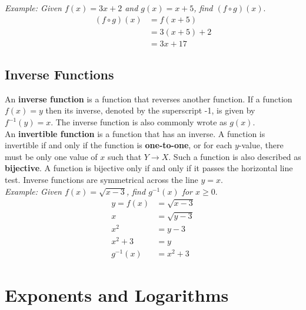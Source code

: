 \documentclass{article}
\begin{document}
    \noindent \color{blue} \textit{Example: Given $f(x)=3x+2$ and $g(x)=x+5$,
    find $(f\circ g)(x)$}. \color{black} \\

    \begin{align*}
        (f\circ g)(x) &= f(x+5) \\
        &= 3(x+5)+2 \\
        &= 3x+17
    \end{align*}

    \subsection{Inverse Functions}
    An \textbf{inverse function} is a function that reverses another function. If a function
    $f(x)=y$ then its inverse, denoted by the superscript -1, is given by $f^{-1}(y)=x$.
    The inverse function is also commonly wrote as $g(x)$. \\

    \noindent An \textbf{invertible function} is a function that has an inverse. A function
    is invertible if and only if the function is \textbf{one-to-one}, or for each $y$-value,
    there must be only one value of $x$ such that $Y\rightarrow X$. Such a function is also
    described as \textbf{bijective}. A function is bijective only if and only if it passes the
    horizontal line test. Inverse functions are symmetrical across the line $y=x$. \\

    \noindent \color{blue} \textit{Example: Given $f(x)=\sqrt{x-3}$, find $g^{-1}(x)$ for
    $x\geq0$}. \color{black} \\

    \begin{align*}
        y=f(x) &= \sqrt{x-3} \\
        x &= \sqrt{y-3} \\
        x^2 &= y-3 \\
        x^2+3 &= y \\
        g^{-1}(x) &= x^2+3
    \end{align*}

    \pagebreak


    \section{Exponents and Logarithms}
\end{document}
